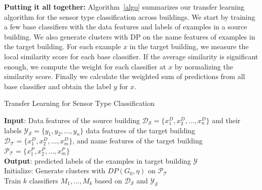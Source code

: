 {\bf Putting it all together:} Algorithm~\ref{algo} summarizes our transfer learning algorithm for the sensor type classification across buildings.
We start by training a few base classifiers with the data features and labels of examples in a source building. We also generate clusters with DP on the name features of examples in the target building. For each example $x$ in the target building, we measure the local similarity score for each base classifier. If the average similarity is significant enough, we compute the weight for each classifier at $x$ by normalizing the similarity score. Finally we calculate the weighted sum of predictions from all base classifier and obtain the label $y$ for $x$.

\begin{algorithm}[ht]
 \caption{Transfer Learning for Sensor Type Classification}
 \label{algo}
 {\bf Input}: Data features of the source building $\mathcal{D_S}=\{x^D_1,x^D_2,\dots,x^D_n\}$ and their labels $\mathcal{Y_S}=\{y_1,y_2,\dots,y_n\}$  data features of the target building $\mathcal{D_T}=\{x^D_1,x^D_2,\dots,x^D_m\}$, and name features of the target building $\mathcal{P_T}=\{x^P_1,x^P_2,\dots,x^P_m\}$\\
 {\bf Output}: predicted labels of the examples in target building $\mathcal{Y}$\\
 Initialize: Generate clusters with $DP(G_{0}, \eta)$ on $\mathcal{P_T}$\\
 Train $k$ classifiers $M_1, \dots, M_k$ based on $\mathcal{D_S}$ and $\mathcal{Y_S}$\;

\end{algorithm}
